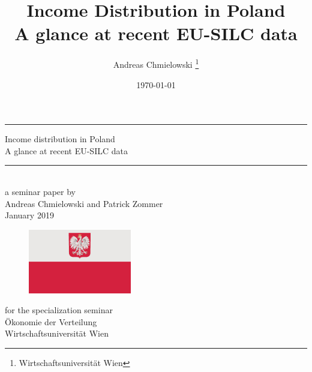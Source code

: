 \documentclass[a4paper]{article}\usepackage[]{graphicx}\usepackage[]{color}
\title{\huge Income Distribution in Poland \\
\Large \center A glance at recent EU-SILC data}
\author{Andreas Chmielowski \thanks{Wirtschaftsuniversität Wien}}
\date{\today}
\begin{document}


\begin{titlepage}

\hfill %
\vspace{2cm}
	\begin{center}
	    \rule{0.7\textwidth}{1.6pt}\vspace*{-\baselineskip}\vspace*{2pt} %
	        \vspace{0.3cm}
	
	        \Huge Income distribution in Poland \\
	        \Large \center A glance at recent EU-SILC data \\
	        \vspace{0.5cm}
	        \rule{0.6\textwidth}{0.4pt} %
	        \vspace{2cm}\\
	        \large a seminar paper by \\
	        \Large \center Andreas Chmielowski \large and \Large Patrick Zommer \\
	        \large \center January 2019
	        \vfill
		    \begin{figure}[h]
		            \centering
		            \includegraphics[width=0.4\textwidth]{flaga.png}
		    \end{figure}
	
	        \vspace{1cm}
	
	    \large for the specialization seminar\\
	    \Large {} Ökonomie der Verteilung\\
	    \vspace{0.3cm}
	    \large Wirtschaftsuniversität Wien
	    \vspace{2cm}

	    \end{center}
    \end{titlepage}

\tableofcontents
\thispagestyle{empty}
\newpage
\setcounter{page}{3}
\end{document}
